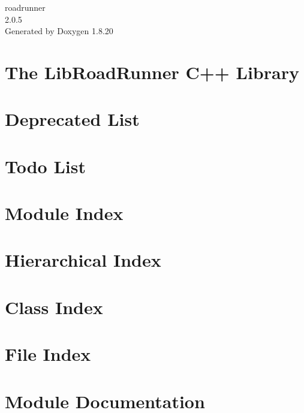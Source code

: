 \let\mypdfximage\pdfximage\def\pdfximage{\immediate\mypdfximage}\documentclass[twoside]{book}
\newcommand{\+}{\discretionary{\mbox{\scriptsize$\hookleftarrow$}}{}{}}
\newcommand{\clearemptydoublepage}{%
  \newpage{\pagestyle{empty}\cleardoublepage}%
}
\begin{document}
\hypersetup{pageanchor=false,
             bookmarksnumbered=true,
             pdfencoding=unicode
            }
\begin{titlepage}
\vspace*{7cm}
\begin{center}%
{\Large roadrunner \\[1ex]\large 2.\+0.\+5 }\\
\vspace*{1cm}
{\large Generated by Doxygen 1.8.20}\\
\end{center}
\end{titlepage}
\clearemptydoublepage
{}
\tableofcontents
\clearemptydoublepage
{}
\hypersetup{pageanchor=true}

\chapter{The Lib\+Road\+Runner C++ Library}
\label{index}\hypertarget{index}{}
\chapter{Deprecated List}
\label{deprecated}

\chapter{Todo List}
\label{todo}

\chapter{Module Index}

\chapter{Hierarchical Index}

\chapter{Class Index}

\chapter{File Index}

\chapter{Module Documentation}





























\end{document}
